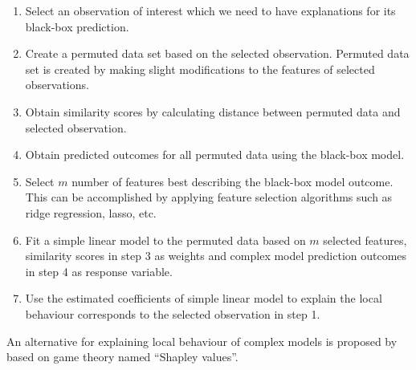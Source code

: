 \documentclass[11pt,a4paper,]{article}
\providecommand{\tightlist}{%
  \setlength{\itemsep}{0pt}\setlength{\parskip}{0pt}}
\begin{document}
\begin{enumerate}
\def\labelenumi{\arabic{enumi}.}
\tightlist
\item
  Select an observation of interest which we need to have explanations for its black-box prediction.
\item
  Create a permuted data set based on the selected observation. Permuted data set is created by making slight modifications to the features of selected observations.
\item
  Obtain similarity scores by calculating distance between permuted data and selected observation.
\item
  Obtain predicted outcomes for all permuted data using the black-box model.
\item
  Select \(m\) number of features best describing the black-box model outcome. This can be accomplished by applying feature selection algorithms such as ridge regression, lasso, etc.
\item
  Fit a simple linear model to the permuted data based on \(m\) selected features, similarity scores in step 3 as weights and complex model prediction outcomes in step 4 as response variable.
\item
  Use the estimated coefficients of simple linear model to explain the local behaviour corresponds to the selected observation in step 1.
\end{enumerate}

An alternative for explaining local behaviour of complex models is proposed by \textcite{lundberg2017unified} based on game theory named ``Shapley values''.
\end{document}
